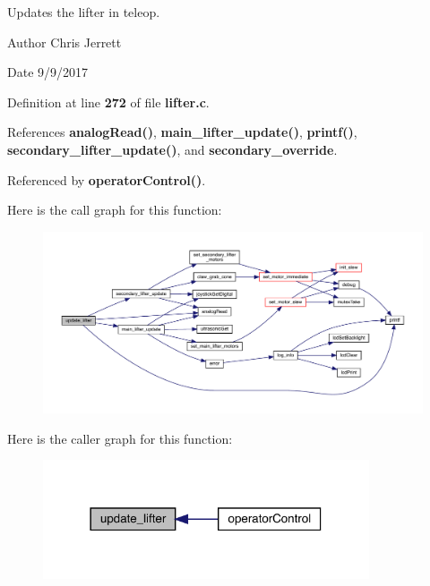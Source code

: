 Updates the lifter in teleop. 

\begin{DoxyAuthor}{Author}
Chris Jerrett 
\end{DoxyAuthor}
\begin{DoxyDate}{Date}
9/9/2017 
\end{DoxyDate}


Definition at line \textbf{ 272} of file \textbf{ lifter.\+c}.



References \textbf{ analog\+Read()}, \textbf{ main\+\_\+lifter\+\_\+update()}, \textbf{ printf()}, \textbf{ secondary\+\_\+lifter\+\_\+update()}, and \textbf{ secondary\+\_\+override}.



Referenced by \textbf{ operator\+Control()}.


Here is the call graph for this function\+:
\nopagebreak
\begin{figure}[H]
\begin{center}
\leavevmode
\includegraphics[width=350pt]{lifter_8h_a59bb7413777ca16aba124aaedf95c79b_cgraph}
\end{center}
\end{figure}
Here is the caller graph for this function\+:
\nopagebreak
\begin{figure}[H]
\begin{center}
\leavevmode
\includegraphics[width=273pt]{lifter_8h_a59bb7413777ca16aba124aaedf95c79b_icgraph}
\end{center}
\end{figure}
